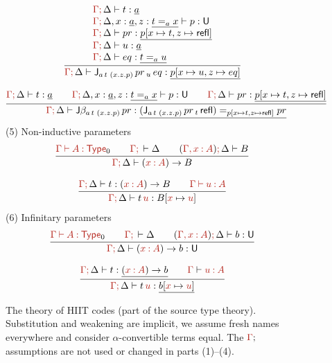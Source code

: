 \documentclass[a4paper,UKenglish]{lipics-v2018}
\newcommand{\U}{\mathsf{U}}
\newcommand{\ra}{\rightarrow}
\newcommand{\refl}{\mathsf{refl}}
\newcommand{\1}{\mathsf{1}} \renewcommand{\Pr}{\mathsf{Pr}}
\renewcommand{\in}{\mathbin{\hat:}}
\renewcommand{\hat}[1]{{\color{BrickRed}{#1}}}
\newcommand{\vdashh}{\mathbin{\hat\vdash}}
\newcommand{\commah}{\hat,\,}
\newcommand{\Type}{\hat{\mathsf{Type}}}
\newcommand{\semicol}{\hat;\,}
\newcommand{\targetass}{\hat{\Gamma}\semicol}
\begin{document}
\begin{figure}
\[
\infer{\targetass\Delta \vdash \J_{a\,t\,\,(x.z.p)}\,pr\,_u\,eq : \underline{p[x\mapsto u, z\mapsto eq]}}
      {\begin{array}{l}
          \targetass\Delta \vdash t : \underline{a} \\
          \targetass\Delta,x:\underline{a},z:\underline{t=_a x}\vdash p : \U \\
          \targetass\Delta \vdash pr : \underline{p[x\mapsto t, z\mapsto \refl]} \\
          \targetass\Delta \vdash u : \underline{a} \\
          \targetass\Delta \vdash eq : \underline{t=_a u}
      \end{array}}
      \]

\[
\infer{\targetass\Delta \vdash \J\beta_{a\,t\,\,(x.z.p)}\,pr:\underline{(\J_{a\,t\,\,(x.z.p)}\,pr\,_t\,\refl) =_{p[x\mapsto t, z\mapsto \refl]} pr}}
      {\targetass\Delta \vdash t : \underline{a}
        && \targetass\Delta,x:\underline{a},z:\underline{t =_a x}\vdash p : \U
        && \targetass\Delta \vdash pr : \underline{p[x\mapsto t, z\mapsto \refl]}
      }
\]
(5) Non-inductive parameters
\[
\begin{gathered}
  \infer{\hat{\Gamma}\semicol\Delta \vdash (\hat{x}\in \hat{A})\ra B}{\hat{\Gamma}\vdashh\hat{A}\in\Type_0 && \hat{\Gamma}\semicol\vdash\Delta && (\hat{\Gamma}\commah\hat{x}\in \hat{A})\semicol \Delta \vdash B}
\end{gathered}
\]

\[
\begin{gathered}
  \infer{\hat{\Gamma}\semicol\Delta \vdash t\, \hat{u} : B[\hat{x}\mapsto \hat{u}]}{\hat{\Gamma}\semicol\Delta \vdash t : (\hat{x}\in \hat{A})\ra B && \hat{\Gamma}\vdashh \hat{u} \in \hat{A}}
\end{gathered}
\]
(6) Infinitary parameters
\[
\begin{gathered}
  \infer{\hat{\Gamma}\semicol\Delta \vdash (\hat{x}\in \hat{A})\ra b : \U}{\hat{\Gamma}\vdashh\hat{A}\in\Type_0 && \hat{\Gamma}\semicol\vdash\Delta && (\hat{\Gamma}\commah\hat{x}\in \hat{A})\semicol \Delta \vdash b : \U}
\end{gathered}
\]

\[
\begin{gathered}
  \infer{\hat{\Gamma}\semicol\Delta \vdash t\, \hat{u} : \underline{b[\hat{x}\mapsto \hat{u}]}}
        {\hat{\Gamma}\semicol\Delta \vdash t : \underline{(\hat{x}\in \hat{A})\ra b} && \hat{\Gamma}\vdash \hat{u} \in \hat{A}}
\end{gathered}
\]
\caption{The theory of HIIT codes (part of the source type
  theory). Substitution and weakening are implicit, we assume fresh
  names everywhere and consider $\alpha$-convertible terms equal. The
  $\hat{\Gamma};$ assumptions are not used or changed in parts
  (1)--(4).}
\label{fig:codes}
\end{figure}
\end{document}
